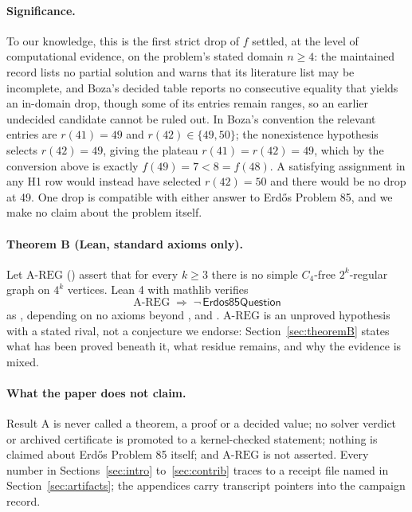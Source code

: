\documentclass{anvil-paper}
\newcommand{\AREG}{\mathrm{A\text{-}REG}}
\newcommand{\Qn}{\textsf{Erdos85Question}}
\theoremstyle{definition}
\begin{document}
\paragraph{Significance.} To our knowledge, this is the first strict drop of $f$ settled, at the level of computational evidence, on the problem's stated domain $n\ge 4$: the maintained record \citep{bloom-erdos85} lists no partial solution and warns that its literature list may be incomplete, and Boza's decided table \citep{boza2024ramsey} reports no consecutive equality that yields an in-domain drop, though some of its entries remain ranges, so an earlier undecided candidate cannot be ruled out. In Boza's convention the relevant entries are $r(41)=49$ and $r(42)\in\{49,50\}$; the nonexistence hypothesis selects $r(42)=49$, giving the plateau $r(41)=r(42)=49$, which by the conversion above is exactly $f(49)=7<8=f(48)$. A satisfying assignment in any H1 row would instead have selected $r(42)=50$ and there would be no drop at 49. One drop is compatible with either answer to Erdős Problem 85, and we make no claim about the problem itself.

\paragraph{Theorem B (Lean, standard axioms only).} Let $\AREG$ () assert that for every $k\ge 3$ there is no simple $C_4$-free $2^k$-regular graph on $4^k$ vertices. Lean 4 \citep{moura2021lean4} with mathlib \citep{mathlib2020} verifies
\[
\AREG \;\Rightarrow\; \neg\,\Qn
\]
as , depending on no axioms beyond ,  and . $\AREG$ is an unproved hypothesis with a stated rival, not a conjecture we endorse: Section~\ref{sec:theoremB} states what has been proved beneath it, what residue remains, and why the evidence is mixed.

\paragraph{What the paper does not claim.} Result A is never called a theorem, a proof or a decided value; no solver verdict or archived certificate is promoted to a kernel-checked statement; nothing is claimed about Erdős Problem 85 itself; and $\AREG$ is not asserted. Every number in Sections~\ref{sec:intro} to~\ref{sec:contrib} traces to a receipt file named in Section~\ref{sec:artifacts}; the appendices carry transcript pointers into the campaign record.
\end{document}
